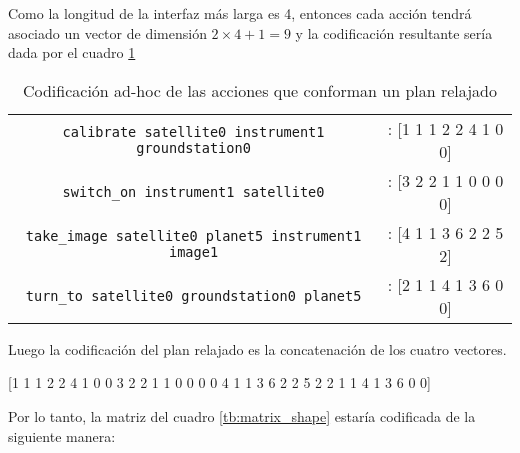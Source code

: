Como la longitud de la interfaz más larga es 4, entonces cada acción tendrá
asociado un vector de dimensión $2 \times 4 + 1 = 9$ y la codificación
resultante sería dada por el cuadro \ref{tab:ohe_plan}

\begin{table}[h!]
    \centering
    \begin{tabular}{c|c}
        \verb|calibrate satellite0 instrument1 groundstation0| &: {} [1 1 1 2 2
        4 1 0 0] \\
        \verb|switch_on instrument1 satellite0| &: {} [3 2 2 1 1 0 0 0 0] \\
        \verb|take_image satellite0 planet5 instrument1 image1| &: {} [4 1 1 3 6
        2 2 5 2] \\
        \verb|turn_to satellite0 groundstation0 planet5| &: {} [2 1 1 4 1 3 6 0
        0] \\
    \end{tabular}
    \caption{Codificación ad-hoc de las acciones que conforman un plan relajado}
    \label{tab:ohe_plan}
\end{table}

Luego la codificación del plan relajado es la concatenación de los cuatro
vectores.

\begin{center}
    [1 1 1 2 2 4 1 0 0 3 2 2 1 1 0 0 0 0 4 1 1 3 6 2 2 5 2 2 1 1 4 1 3 6 0 0]
\end{center}

Por lo tanto, la matriz del cuadro \ref{tb:matrix_shape} estaría codificada de
la siguiente manera:

\begin{table}[h!]
\centering
{}
 \caption{Planes relajados y acciones etiquetadas usando codificación ad-hoc.}
 \label{tb:matrix_shape_ohe}
\end{table}


